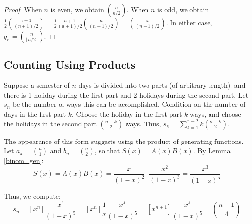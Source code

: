 \documentclass[a4paper]{article}
\begin{document}
\begin{theorem}
\begin{hl}
\begin{proof}
When $n$ is even, we obtain $\binom n{n/2}$. When $n$ is odd, we obtain $\frac12\binom{n+1}{(n+1)/2}=\frac12\frac{n+1}{(n+1)/2}\binom{n}{(n-1)/2}=\binom n{(n-1)/2}$. In either case, $q_n=\binom n{\lfloor n/2\rfloor}$.
\end{proof}
\end{hl}
\end{theorem}

\subsection{Counting Using Products}


\begin{example}
Suppose a semester of $n$ days is divided into two parts (of arbitrary length), and there is 1 holiday during the first part and 2 holidays during the second part. Let $s_n$ be the number of ways this can be accomplished. Condition on the number of days in the first part $k$. Choose the holiday in the first part $k$ ways, and choose the holidays in the second part $\binom{n-k}2$ ways. Thus, $s_n=\sum_{k=1}^{n-2}k\binom{n-k}2$.

\medskip

The appearance of this form suggests using the product of generating functions. Let $a_n=\binom n1$ and $b_n=\binom n2$, so that $S(x)=A(x)B(x)$. By Lemma \ref{binom_gen}:
\begin{equation*}
S(x)
=A(x)B(x)
=\frac{x}{(1-x)^2}\cdot \frac{x^2}{(1-x)^3}
=\frac{x^3}{(1-x)^5}
\end{equation*}

Thus, we compute:
\begin{equation*}
s_n
=[x^n]\frac{x^3}{(1-x)^5}
=[x^n]\frac1x\frac{x^4}{(1-x)^5}
=[x^{n+1}]\frac{x^4}{(1-x)^5}
=\binom{n+1}4
\end{equation*}
\end{example}
\end{document}
